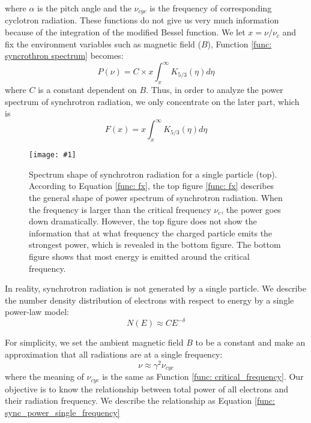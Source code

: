 \documentclass[12pt]{report}
\newcommand{\singleFig}[3]{
  \begin{figure}[!htp]
    \centering
    \texttt{[image: \#1]}
    \caption{#3}
    \label{fig: #1}
  \end{figure}
}
\begin{document}
      where $\alpha$ is the pitch angle and the $\nu_{cyc}$ is the frequency of 
      corresponding cyclotron radiation. These functions do not give us very much 
      information because of the integration of the modified Bessel function. We let 
      $x = \nu / \nu_c$ and fix the environment variables such as magnetic field ($B$), 
      Function \ref{func: syncrothron spectrum} becomes: 
      \begin{equation}
        \label{func: to_x}
        P\left(\nu\right) = C \times x \int_{x}^{\infty} K_{5/3}\left(\eta \right)d\eta 
      \end{equation}
      where $C$ is a constant dependent on $B$. Thus, in order to analyze the power spectrum of synchrotron radiation,
      we only concentrate on the later part, which is
      \begin{equation}
        \label{func: fx}
        F\left(x\right) = x \int_{x}^{\infty} K_{5/3}\left(\eta \right)d\eta 
      \end{equation}
            
      \singleFig{sync_spectrum_loglog_combined}{0.5}{Spectrum shape of synchrotron 
      radiation for a single particle (top). According to Equation \ref{func: fx},
      the top figure \ref{func: fx} describes the general shape of power spectrum of 
      synchrotron radiation. When the frequency is larger than
      the critical frequency $\nu_c$, the power goes down dramatically. However, the 
      top figure does not show the information that at what frequency the charged 
      particle emits the strongest power, which is revealed in the bottom figure. 
      The bottom figure shows that most energy is emitted around the critical frequency.}

      In reality, synchrotron radiation is not generated by a single particle. We 
      describe the number density distribution of electrons with respect to energy by a 
      single power-law model:
      \begin{equation}
        \label{func: sync_number_density}
        N\left(E\right) \approx C E^{-\delta}
      \end{equation}
    
      For simplicity, we set the ambient magnetic field $B$ to be a constant and make an 
      approximation that all radiations are at a single frequency:
      \begin{equation}
        \label{func: sync_approximation}
        \nu \approx \gamma^2 \nu_{cyc}
      \end{equation}
      where the meaning of $\nu_{cyc}$ is the same as Function 
      \ref{func: critical_frequency}. Our objective is to know the relationship between 
      total power of all electrons and their radiation frequency. We describe the 
      relationship as Equation \ref{func: sync_power_single_frequency}
        
\end{document}
